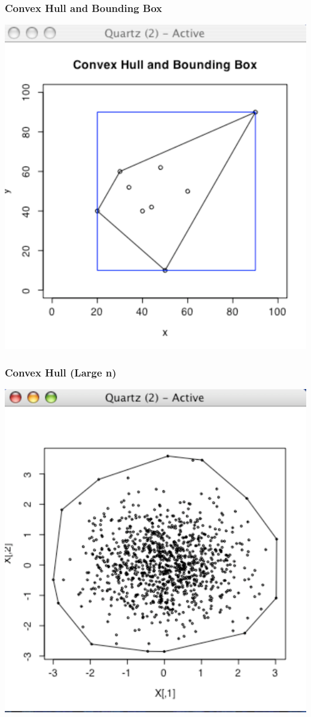 \documentclass[nototal]{beamer}
\begin{document}
\begin{frame}
   \frametitle{Convex Hull and Bounding Box}
   \begin{center}
     \includegraphics[width=.65\linewidth]{ppbbconvex}
   \end{center}
 \end{frame}

\begin{frame}
   \frametitle{Convex Hull (Large n)}
   \begin{center}
     \includegraphics[width=.65\linewidth]{ppconvex1}
   \end{center}
 \end{frame}
\end{document}
